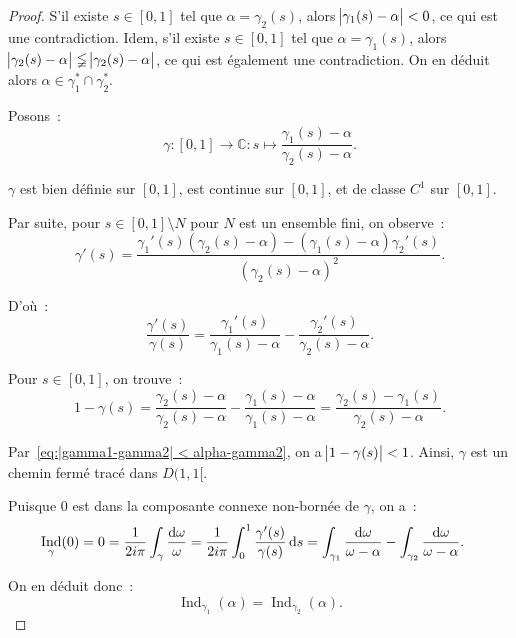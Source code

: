 \documentclass{report}
\theoremstyle{definition}
\theoremstyle{remark}
\numberwithin{equation}{section}
\newcommand{\C}{\mathbb C}
\DeclareMathOperator{\Ind}{Ind}
\begin{document}
			\begin{proof} S'il existe $s \in [0, 1]$ tel que $\alpha = \gamma_2(s)$, alors $\abs {\gamma_1(s)-\alpha} < 0$, ce qui est une contradiction. Idem, s'il
			existe $s \in [0, 1]$ tel que $\alpha = \gamma_1(s)$, alors $\abs {\gamma_2(s) - \alpha} \lneqq \abs {\gamma_2(s) - \alpha}$, ce qui est également
			une contradiction. On en déduit alors $\alpha \in \gamma_1^* \cap \gamma_2^*$.

			Posons~:
			\begin{equation}
				\gamma : [0, 1] \to \C : s \mapsto \frac {\gamma_1(s) - \alpha}{\gamma_2(s) - \alpha}.
			\end{equation}

			$\gamma$ est bien définie sur $[0, 1]$, est continue sur $[0, 1]$, et de classe $C^1$ sur $[0, 1]$.

			Par suite, pour $s \in [0, 1] \setminus N$ pour $N$ est un ensemble fini, on observe~:
			\begin{equation}
				\gamma'(s) = \frac {\gamma_1'(s)(\gamma_2(s) - \alpha) - (\gamma_1(s) - \alpha)\gamma_2'(s)}{(\gamma_2(s) - \alpha)^2}.
			\end{equation}

			D'où~:
			\begin{equation}
				\frac {\gamma'(s)}{\gamma(s)} = \frac {\gamma_1'(s)}{\gamma_1(s) - \alpha} - \frac {\gamma_2'(s)}{\gamma_2(s) - \alpha}.
			\end{equation}

			Pour $s \in [0, 1]$, on trouve~:
			\begin{equation}
				1 - \gamma(s) = \frac {\gamma_2(s) - \alpha}{\gamma_2(s) - \alpha} - \frac {\gamma_1(s) - \alpha}{\gamma_1(s) - \alpha}
					= \frac {\gamma_2(s) - \gamma_1(s)}{\gamma_2(s) - \alpha}.
			\end{equation}

			Par~\eqref{eq:|gamma1-gamma2| < alpha-gamma2}, on a $\abs {1 - \gamma(s)} < 1$. Ainsi, $\gamma$ est un chemin fermé tracé dans $D(1, 1[$.

			Puisque $0$ est dans la composante connexe non-bornée de $\gamma$, on a~:
			\begin{align}
				\Ind_\gamma(0) &= 0 = \frac 1{2i\pi}\int_\gamma \frac {\dif \omega}{\omega} = \frac 1{2i\pi}\int_0^1\frac {\gamma'(s)}{\gamma(s)}\dif s
					= \int_{\gamma_1}\frac {\dif \omega}{\omega-\alpha} - \int_{\gamma_2}\frac {\dif \omega}{\omega-\alpha}.
			\end{align}

			On en déduit donc~:
			\begin{equation}
				\Ind_{\gamma_1}(\alpha) = \Ind_{\gamma_2}(\alpha).
			\end{equation}
			\end{proof}
\end{document}
